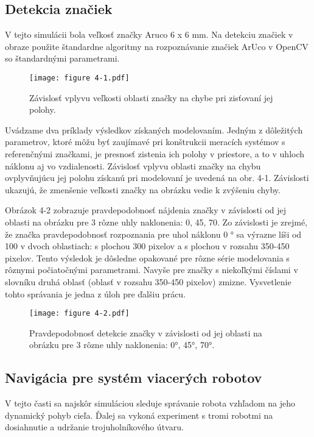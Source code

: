 \subsection{Detekcia značiek}
V tejto simulácii bola veľkosť značky Aruco 6 x 6 mm. 
Na detekciu značiek v obraze použite štandardne algoritmy na rozpoznávanie značiek ArUco v OpenCV so štandardnými parametrami.
 
\begin{figure}[ht!]
    \centering
    \texttt{[image: figure 4-1.pdf]}
    \caption{Závislosť vplyvu veľkosti oblasti značky na chybe pri zisťovaní jej polohy.}
    \label{o:41}
\end{figure} 
\vspace{3mm}

\justifying
\noindent
Uvádzame dva príklady výsledkov získaných modelovaním. 
Jedným z dôležitých parametrov, ktoré môžu byť zaujímavé pri konštrukcii meracích systémov s referenčnými značkami,
 je presnosť zistenia ich polohy v priestore, a to v uhloch náklonu aj vo vzdialenosti. Závislosť vplyvu oblasti značky
  na chybu ovplyvňujúcu jej polohu získanú pri modelovaní je uvedená na obr. 4-1. Závislosti ukazujú, že zmenšenie 
  veľkosti značky na obrázku vedie k zvýšeniu chyby.
\vspace{3mm}
 
\justifying
\noindent
Obrázok 4-2 zobrazuje pravdepodobnosť nájdenia značky v závislosti od jej oblasti na obrázku pre
3 rôzne uhly naklonenia: 0, 45, 70. Zo závislosti je zrejmé, že značka
pravdepodobnosť rozpoznania pre uhol náklonu 0 ° sa výrazne líši od 100 v dvoch oblastiach:
s plochou 300 pixelov a s plochou v rozsahu 350-450 pixelov. Tento výsledok je
dôsledne opakované pre rôzne série modelovania s rôznymi počiatočnými parametrami.
Navyše pre značky s niekoľkými číslami v slovníku druhá oblasť (oblasť v rozsahu 350-450 pixelov) zmizne. Vysvetlenie tohto správania je jedna z úloh pre ďalšiu prácu.
\begin{figure}[ht!]
    \centering 
    \texttt{[image: figure 4-2.pdf]}
    \caption{Pravdepodobnosť detekcie značky v závislosti od jej oblasti na obrázku pre 3 rôzne uhly naklonenia: 0°, 45°, 70°.}
    \label{o:42}
\end{figure}

\subsection{Navigácia pre systém viacerých robotov}
V tejto časti sa najskôr simuláciou sleduje správanie robota vzhľadom na jeho dynamický pohyb cieľa. 
Ďalej sa vykoná experiment s tromi robotmi na dosiahnutie a udržanie trojuholníkového útvaru.
